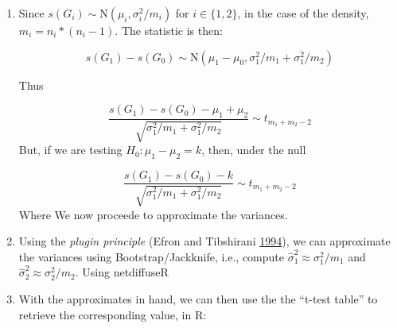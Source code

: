 \documentclass[]{book}
\newenvironment{Shaded}{\begin{snugshade}}{\end{snugshade}}
\newcommand{\CommentTok}[1]{\textcolor[rgb]{0.56,0.35,0.01}{\textit{#1}}}
\newcommand{\ControlFlowTok}[1]{\textcolor[rgb]{0.13,0.29,0.53}{\textbf{#1}}}
\newcommand{\DataTypeTok}[1]{\textcolor[rgb]{0.13,0.29,0.53}{#1}}
\newcommand{\DecValTok}[1]{\textcolor[rgb]{0.00,0.00,0.81}{#1}}
\newcommand{\KeywordTok}[1]{\textcolor[rgb]{0.13,0.29,0.53}{\textbf{#1}}}
\newcommand{\NormalTok}[1]{#1}
\newcommand{\OperatorTok}[1]{\textcolor[rgb]{0.81,0.36,0.00}{\textbf{#1}}}
\newcommand{\StringTok}[1]{\textcolor[rgb]{0.31,0.60,0.02}{#1}}
\begin{document}
\begin{enumerate}
\def\labelenumi{\arabic{enumi}.}
\item
  Since \(s(G_i)\sim \mbox{N}(\mu_i,\sigma_i^2/m_i)\) for \(i\in\{1,2\}\), in the case
  of the density, \(m_i = n_i * (n_i - 1)\). The statistic is then:

  \[
  s(G_1) - s(G_0)\sim \mbox{N}(\mu_1-\mu_0, \sigma_1^2/m_1 + \sigma_1^2/m_2)
  \]

  Thus

  \[
  \frac{s(G_1) - s(G_0) - \mu_1 + \mu_2}{\sqrt{\sigma_1^2/{m_1} + \sigma_1^2/{m_2}}} \sim t_{m_1 + m_2 - 2}
  \]
  But, if we are testing \(H_0: \mu_1 - \mu_2 = k\), then, under the null

  \[
  \frac{s(G_1) - s(G_0) - k}{\sqrt{\sigma_1^2/{m_1} + \sigma_1^2/{m_2}}} \sim t_{m_1 + m_2 - 2}
  \]
  Where We now proceede to approximate the variances.
\item
  Using the \emph{plugin principle} (Efron and Tibshirani \protect\hyperlink{ref-Efron1994}{1994}), we can approximate the variances
  using Bootstrap/Jackknife, i.e., compute \(\hat\sigma_1^2\approx\sigma_1^2/m_1\) and
  \(\hat\sigma_2^2\approx\sigma_2^2/m_2\). Using netdiffuseR

\begin{Shaded}
\end{Shaded}
\item
  With the approximates in hand, we can then use the the ``t-test table'' to
  retrieve the corresponding value, in R:


\end{enumerate}
\end{document}
